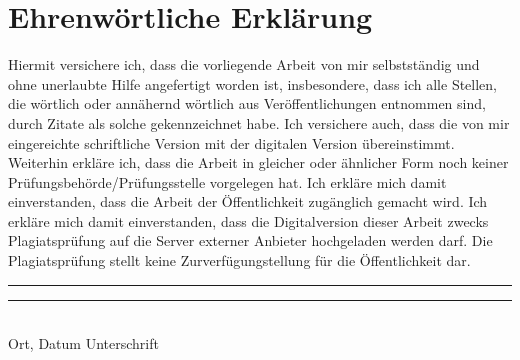 
\pagestyle{empty}

\section*{Ehrenwörtliche Erklärung}
Hiermit versichere ich, dass die vorliegende Arbeit von mir selbstständig und ohne unerlaubte Hilfe angefertigt worden ist, insbesondere, dass ich alle Stellen, die wörtlich oder annähernd wörtlich aus Veröffentlichungen entnommen sind, durch Zitate als solche gekennzeichnet habe. Ich versichere auch, dass die von mir eingereichte schriftliche Version mit der digitalen Version übereinstimmt. Weiterhin erkläre ich, dass die Arbeit in gleicher oder ähnlicher Form noch keiner Prüfungsbehörde/Prüfungsstelle vorgelegen hat. Ich erkläre mich damit einverstanden, dass die Arbeit der Öffentlichkeit zugänglich gemacht wird. Ich erkläre mich damit einverstanden, dass die Digitalversion dieser Arbeit zwecks Plagiatsprüfung auf die Server externer Anbieter hochgeladen werden darf. Die Plagiatsprüfung stellt keine Zurverfügungstellung für die Öffentlichkeit dar. 

\vspace{3cm}
\noindent\rule{6cm}{0.4pt} \hfill \rule{6cm}{0.4pt}\\ 
Ort, Datum \hspace{7.4cm} Unterschrift 
